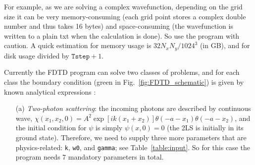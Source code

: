 \documentclass[12pt,letter,onecolumn,notitlepage]{article}
\begin{document}
For example, as we are solving a complex wavefunction,
depending on the grid size it can be very memory-consuming (each grid point stores a complex double number and thus takes 16 bytes)
and space-consuming (the wavefunction is written to a plain txt when the calculation is done). So use the program with caution. A quick estimation for memory usage is $32N_xN_y/1024^3$ (in GB), and for disk usage divided by $\texttt{Tstep}+1$.

Currently the FDTD program can solve two classes of problems, and for each class the boundary condition (green in Fig.~\ref{fig:FDTD_schematic}) is given by known analytical expressions \cite{FangNM17}:
\begin{enumerate}
	\item[(a)] \textit{Two-photon scattering}: the incoming photons are described by continuous wave, $\chi(x_1, x_2, 0) = A^2 \exp[i k (x_1+x_2)]\theta(-a-x_1)\theta(-a-x_2)$, and the initial condition for $\psi$ is simply $\psi(x,0)=0$ (the 2LS is initially in its ground state). Therefore, we need to supply three more parameters that are physics-related: \texttt{k}, \texttt{w0}, and \texttt{gamma}; see Table~\ref{table:input}. So for this case the program needs 7 mandatory parameters in total.
	

\end{enumerate}
\end{document}
